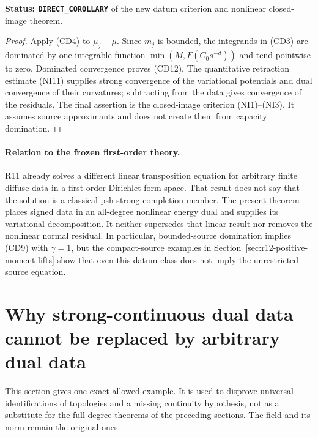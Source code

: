 \documentclass[11pt,a4paper]{article}
\numberwithin{equation}{section}
\theoremstyle{definition}
\theoremstyle{remark}
\begin{document}
\noindent\textbf{Status: \texttt{DIRECT\_COROLLARY}} of
the new datum criterion and nonlinear closed-image theorem.

\begin{proof}
Apply (CD4) to $\mu_j-\mu$. Since $m_j$ is bounded, the
integrands in (CD3) are dominated by one integrable function
$\min(M,F(C_0s^{-d}))$ and tend pointwise to zero. Dominated
convergence proves (CD12). The quantitative retraction estimate
(NI11) supplies strong convergence of the variational potentials
and dual convergence of their curvatures; subtracting from the
data gives convergence of the residuals. The final assertion is
the closed-image criterion (NI1)--(NI3). It assumes source
approximants and does not create them from capacity domination.
\end{proof}

\paragraph{Relation to the frozen first-order theory.}
R11 already solves a different linear transposition equation for
arbitrary finite diffuse data in a first-order Dirichlet-form
space. That result does not say that the solution is a classical
psh strong-completion member. The present theorem places signed
data in an all-degree nonlinear energy dual and supplies its
variational decomposition. It neither supersedes that linear
result nor removes the nonlinear normal residual. In particular,
bounded-source domination implies (CD9) with $\gamma=1$, but
the compact-source examples in Section~\ref{sec:r12-positive-moment-lifts}
show that even this datum class does not imply the unrestricted
source equation.



\section{Why strong-continuous dual data cannot be replaced by arbitrary dual data}
\label{sec:r12-strong-dual-counterexample}

This section gives one exact allowed example. It is used to disprove
universal identifications of topologies and a missing continuity
hypothesis, not as a substitute for the full-degree theorems of the
preceding sections. The field and its norm remain the original ones.
\end{document}
